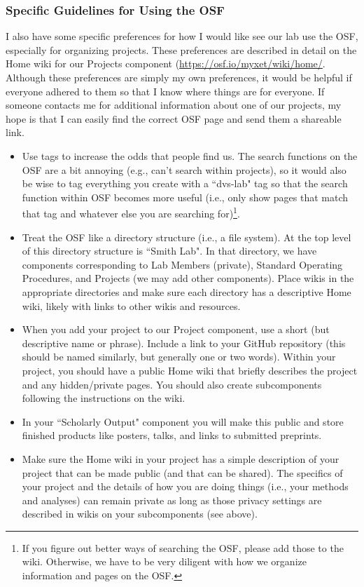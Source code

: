 \documentclass[letterpaper,12pt,oneside]{memoir}
\begin{document}
\subsubsection{Specific Guidelines for Using the OSF}

I also have some specific preferences for how I would like see our lab use the OSF, especially for organizing projects. These preferences are described in detail on the Home wiki for our Projects component (\url{https://osf.io/myxet/wiki/home/}. Although these preferences are simply my own preferences, it would be helpful if everyone adhered to them so that I know where things are for everyone. If someone contacts me for additional information about one of our projects, my hope is that I can easily find the correct OSF page and send them a shareable link.

\begin{itemize}

\item Use tags to increase the odds that people find us. The search functions on the OSF are a bit annoying (e.g., can't search within projects), so it would also be wise to tag everything you create with a ``dvs-lab" tag so that the search function within OSF becomes more useful (i.e., only show pages that match that tag and whatever else you are searching for)\footnote{If you figure out better ways of searching the OSF, please add those to the wiki. Otherwise, we have to be very diligent with how we organize information and pages on the OSF.}.

\item Treat the OSF like a directory structure (i.e., a file system). At the top level of this directory structure is ``Smith Lab". In that directory, we have components corresponding to Lab Members (private), Standard Operating Procedures, and Projects (we may add other components). Place wikis in the appropriate directories and make sure each directory has a descriptive Home wiki, likely with links to other wikis and resources. 

\item When you add your project to our Project component, use a short (but descriptive name or phrase). Include a link to your GitHub repository (this should be named similarly, but generally one or two words). Within your project, you should have a public Home wiki that briefly describes the project and any hidden/private pages. You should also create subcomponents following the instructions on the wiki.

\item In your ``Scholarly Output" component you will make this public and store finished products like posters, talks, and links to submitted preprints. 

\item Make sure the Home wiki in your project has a simple description of your project that can be made public (and that can be shared). The specifics of your project and the details of how you are doing things (i.e., your methods and analyses) can remain private as long as those privacy settings are described in wikis on your subcomponents (see above). 

\end{itemize}
\end{document}
